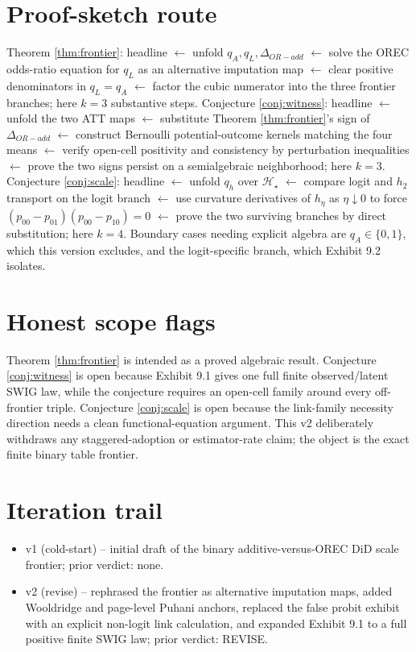 \documentclass[11pt]{article}
\theoremstyle{definition}
\theoremstyle{plain}
\theoremstyle{remark}
\begin{document}
\section{Proof-sketch route}
Theorem \ref{thm:frontier}: headline \(\leftarrow\) unfold \(q_A,q_L,\Delta_{OR-add}\) \(\leftarrow\) solve the OREC odds-ratio equation for \(q_L\) as an alternative imputation map \(\leftarrow\) clear positive denominators in \(q_L=q_A\) \(\leftarrow\) factor the cubic numerator into the three frontier branches; here \(k=3\) substantive steps.  Conjecture \ref{conj:witness}: headline \(\leftarrow\) unfold the two ATT maps \(\leftarrow\) substitute Theorem \ref{thm:frontier}'s sign of \(\Delta_{OR-add}\) \(\leftarrow\) construct Bernoulli potential-outcome kernels matching the four means \(\leftarrow\) verify open-cell positivity and consistency by perturbation inequalities \(\leftarrow\) prove the two signs persist on a semialgebraic neighborhood; here \(k=3\).  Conjecture \ref{conj:scale}: headline \(\leftarrow\) unfold \(q_h\) over \(\mathcal H_\star\) \(\leftarrow\) compare logit and \(h_2\) transport on the logit branch \(\leftarrow\) use curvature derivatives of \(h_\eta\) as \(\eta\downarrow0\) to force \((p_{00}-p_{01})(p_{00}-p_{10})=0\) \(\leftarrow\) prove the two surviving branches by direct substitution; here \(k=4\).  Boundary cases needing explicit algebra are \(q_A\in\{0,1\}\), which this version excludes, and the logit-specific branch, which Exhibit 9.2 isolates.

\section{Honest scope flags}
Theorem \ref{thm:frontier} is intended as a proved algebraic result.  Conjecture \ref{conj:witness} is open because Exhibit 9.1 gives one full finite observed/latent SWIG law, while the conjecture requires an open-cell family around every off-frontier triple.  Conjecture \ref{conj:scale} is open because the link-family necessity direction needs a clean functional-equation argument.  This v2 deliberately withdraws any staggered-adoption or estimator-rate claim; the object is the exact finite binary table frontier.

\section{Iteration trail}
\begin{itemize}[leftmargin=*]
\item v1 (cold-start) -- initial draft of the binary additive-versus-OREC DiD scale frontier; prior verdict: none.
\item v2 (revise) -- rephrased the frontier as alternative imputation maps, added Wooldridge and page-level Puhani anchors, replaced the false probit exhibit with an explicit non-logit link calculation, and expanded Exhibit 9.1 to a full positive finite SWIG law; prior verdict: REVISE.
\end{itemize}
\end{document}
